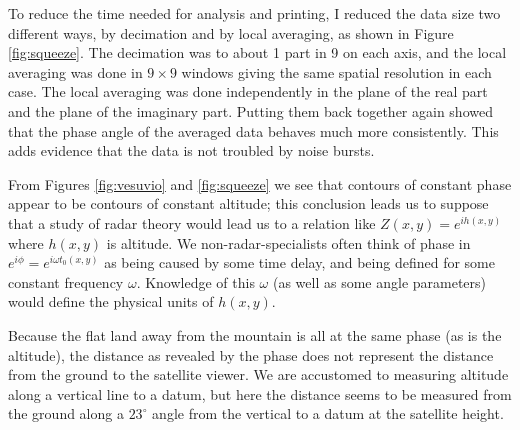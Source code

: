 \par
To reduce the time needed for analysis and printing,
I reduced the data size two different ways,
by decimation and by local averaging,
as shown in Figure \ref{fig:squeeze}.
The decimation was to about 1 part in 9 on each axis,
and the local averaging was done in $9\times 9$ windows
giving the same spatial resolution in each case.
The local averaging was done independently in the
plane of the real part and the plane of the imaginary part.
Putting them back together again showed that the phase
angle of the averaged data behaves much more consistently.
This adds evidence that the data is not troubled by noise bursts.

\par
From Figures \ref{fig:vesuvio} and \ref{fig:squeeze}
we see that contours of constant phase
appear to be contours of constant altitude;
this conclusion leads us to suppose that a study of radar theory
would lead us to a relation like $Z(x,y)=e^{ih(x,y)}$
where $h(x,y)$ is altitude.
We non-radar-specialists often think of phase in
$e^{i\phi} = e^{i\omega t_0(x,y)}$
as being caused by some time delay, and
being defined for some constant frequency $\omega$.
Knowledge of this $\omega$ (as well as some angle parameters)
would define the physical units of $h(x,y)$.

Because the flat land away from the mountain is all at the same phase
(as is the altitude),
the distance as revealed by the phase does not represent
the distance from the ground to the satellite viewer.
We are accustomed to measuring altitude along a vertical line to a datum,
but here the distance seems to be measured
from the ground along a $23^\circ$ angle from the vertical
to a datum at the satellite height.


